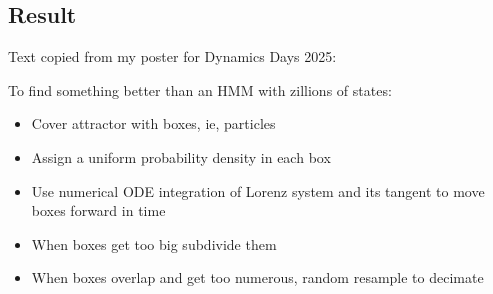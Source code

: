 \documentclass[12pt]{article}
\begin{document}
\subsection{Result}
\label{sec:particle_result}

Text copied from my poster for Dynamics Days 2025:

To find something better than an HMM with zillions of states:
\begin{itemize}
\item Cover attractor with boxes, ie, particles
\item Assign a uniform probability density in each box
\item Use numerical ODE integration of Lorenz system and its tangent
  to move boxes forward in time
\item When boxes get too big subdivide them
\item When boxes overlap and get too numerous, random resample to
  decimate
\end{itemize}
\begin{center}
  \\
  \\
\end{center}
\end{document}

